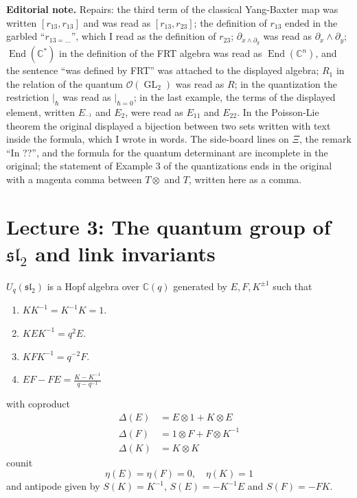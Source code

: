 \medskip\noindent
{\bf Editorial note.}
Repairs: the third term of the classical
Yang-Baxter map was written
$[r_{13},r_{13}]$ and was read as
$[r_{13},r_{23}]$; the definition of
$r_{13}$ ended in the garbled
``$r_{13=\ldots}$'', which I read as the
definition of $r_{23}$; $\partial_{x\wedge
\partial_{y}}$ was read as
$\partial_{x}\wedge\partial_{y}$;
$\operatorname{End}(\mathbb{C}^{*})$ in
the definition of the FRT algebra was
read as $\operatorname{End}
(\mathbb{C}^{n})$, and the sentence
``was defined by FRT'' was attached to
the displayed algebra; $R_{1}$
in the relation of the quantum
$\mathcal{O}(\operatorname{GL}_{2})$ was
read as $R$; in the quantization the
restriction $|_{\hbar}$ was read as
$|_{\hbar=0}$; in the last example, the
terms of the displayed element, written
$E_{^{-1}}$ and $E_{2}$, were read as
$E_{11}$ and $E_{22}$. In the
Poisson-Lie theorem the original
displayed a bijection between two sets
written with text inside the formula,
which I wrote in words. The side-board
lines on $\Xi$, the remark ``In ??'', and
the formula for the quantum determinant
are incomplete in the original; the
statement of Example 3 of the
quantizations ends in the original with
a magenta comma between $T\otimes$ and
$T$, written here as a comma.

\section{Lecture 3: The quantum group of
$\mathfrak{sl}_{2}$ and link invariants}
\label{section-lecture-3}

\begin{definition}
\label{definition-l3-uq-sl2}
$U_{q}(\mathfrak{sl}_{2})$ is a Hopf
algebra over $\mathbb{C}(q)$ generated by
$E,F,K^{\pm 1}$ such that
\begin{enumerate}
\item $KK^{-1} =K^{-1} K=1$.
\item $KEK^{-1}=q^{2}E$.
\item $KFK^{-1} =q^{-2} F$.
\item $EF-FE=\frac{K-K^{-1}}{q-q^{-1}}$
\end{enumerate}
with coproduct
$$
\begin{aligned}
\Delta(E)&=E\otimes 1+K\otimes E\\
\Delta(F)&=1\otimes F+F\otimes K^{-1} \\
\Delta(K)&=K\otimes K
\end{aligned}
$$
counit
$$
\eta(E)=\eta(F)=0,\quad \eta(K)=1
$$
and antipode given by $S(K)=K^{-1}$,
$S(E)=-K^{-1} E$ and $S(F)=-FK$.
\end{definition}

